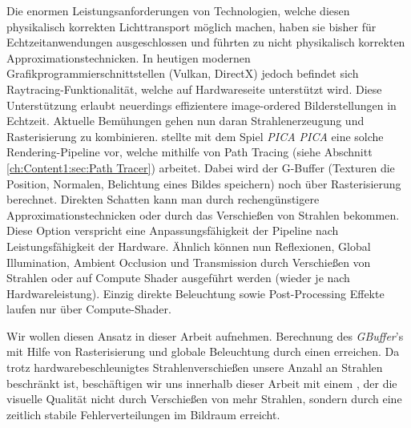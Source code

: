 Die enormen Leistungsanforderungen von Technologien, welche diesen physikalisch korrekten Lichttransport möglich machen, haben sie bisher für Echtzeitanwendungen ausgeschlossen 
und führten zu nicht physikalisch korrekten Approximationstechnicken.
In heutigen modernen Grafikprogrammierschnittstellen (Vulkan, DirectX) jedoch befindet sich Raytracing-Funktionalität, welche auf Hardwareseite unterstützt wird.
Diese Unterstützung erlaubt neuerdings effizientere image-ordered Bilderstellungen in Echtzeit.  
Aktuelle Bemühungen gehen nun daran Strahlenerzeugung und Rasterisierung zu kombinieren. \cite{Barre-Brisebois2019} stellte
mit dem Spiel \textit{PICA PICA} eine solche Rendering-Pipeline vor, welche mithilfe von Path Tracing
(siehe Abschnitt \ref{ch:Content1:sec:Path Tracer}) arbeitet. Dabei wird der G-Buffer
(Texturen die Position, Normalen, Belichtung eines Bildes speichern) noch über Rasterisierung berechnet. Direkten Schatten kann man durch
rechengünstigere Approximationstechnicken oder durch das Verschießen von Strahlen bekommen. Diese Option verspricht eine Anpassungsfähigkeit der Pipeline nach Leistungsfähigkeit der Hardware. Ähnlich können nun
Reflexionen, Global Illumination, Ambient Occlusion und Transmission durch Verschießen von Strahlen oder auf Compute Shader ausgeführt werden (wieder je nach 
Hardwareleistung). Einzig direkte Beleuchtung sowie Post-Processing Effekte laufen nur über Compute-Shader. \par

Wir wollen diesen Ansatz in dieser Arbeit aufnehmen. Berechnung des \textit{GBuffer}'s mit Hilfe von Rasterisierung und globale Beleuchtung durch 
einen  erreichen. Da trotz hardwarebeschleunigtes Strahlenverschießen unsere Anzahl an Strahlen beschränkt ist, 
beschäftigen wir uns innerhalb dieser Arbeit mit einem , der die visuelle Qualität nicht durch Verschießen von mehr Strahlen, 
sondern durch eine zeitlich stabile  Fehlerverteilungen im Bildraum erreicht.